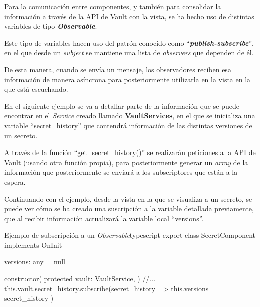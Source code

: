 \documentclass{\ClassPath/viu-tfm-template}
\begin{document}
Para la comunicación entre componentes, y también para consolidar la información a través de la API de Vault con la vista, se ha hecho uso de distintas variables de tipo \textbf{\textit{Observable}}.

Este tipo de variables hacen uso del patrón conocido como “\textit{\textbf{publish-subscribe}}”, en el que desde un \textit{subject} se mantiene una lista de \textit{observers} que dependen de él.

De esta manera, cuando se envía un mensaje, los observadores reciben esa información de manera asíncrona para posteriormente utilizarla en la vista en la que está escuchando.

En el siguiente ejemplo se va a detallar parte de la información que se puede encontrar en el \textit{Service} creado llamado \textbf{VaultServices}, en el que se inicializa una variable “secret\_history” que contendrá información de las distintas versiones de un secreto.

A través de la función “get\_secret\_history()” se realizarán peticiones a la API de Vault (usando otra función propia), para posteriormente generar un \textit{array} de la información que posteriormente se enviará a los subscriptores que están a la espera.


Continuando con el ejemplo, desde la vista en la que se visualiza a un secreto, se puede ver cómo se ha creado una suscripción a la variable detallada previamente, que al recibir información actualizará la variable local “versions”.

\begin{mycode}{Ejemplo de subscripción a un \textit{Observable}}{typescript}{}
export class SecretComponent implements OnInit {
    versions: any = null

    constructor(
        protected vault: VaultService,
    ) {
        //...
        this.vault.secret_history.subscribe(secret_history => {
            this.versions = secret_history
        })
    }
}
\end{mycode}
\end{document}

